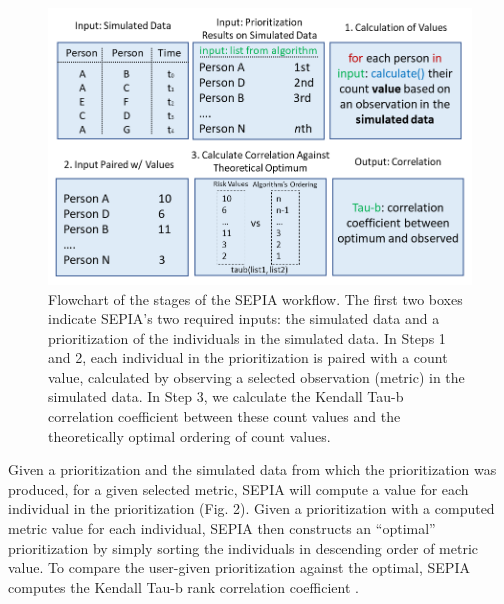 \documentclass[twocolumn]{bmcart}%
\begin{document}

\begin{figure}[!h]
\centering
\includegraphics[scale=0.34]{Figures/SEPIA workflow.png}
\caption{Flowchart of the stages of the SEPIA workflow. The first two boxes indicate SEPIA's two required inputs: the simulated data and a prioritization of the individuals in the simulated data. In Steps 1 and 2, each individual in the prioritization is paired with a count value, calculated by observing a selected observation (metric) in the simulated data. In Step 3, we calculate the Kendall Tau-b correlation coefficient between these count values and the theoretically optimal ordering of count values.}
\end{figure}

Given a prioritization and the simulated data from which the prioritization was produced, for a given selected metric, SEPIA will compute a value for each individual in the prioritization (Fig. 2). Given a prioritization with a computed metric value for each individual, SEPIA then constructs an ``optimal'' prioritization by simply sorting the individuals in descending order of metric value. To compare the user-given prioritization against the optimal, SEPIA computes the Kendall Tau-b rank correlation coefficient \cite{kendall1938new}.
\end{document}

